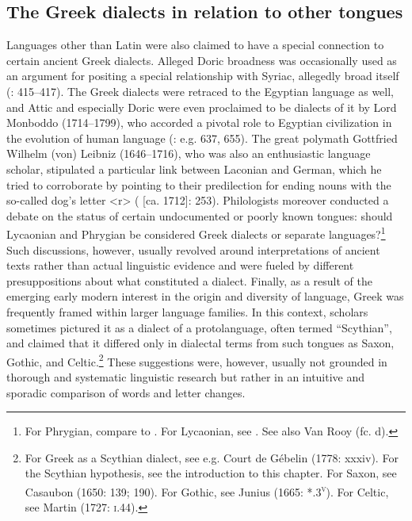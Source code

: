 \subsection{The Greek dialects in relation to other tongues}
\hypertarget{Toc19704841}{}
Languages other than Latin were also claimed to have a special connection to certain ancient Greek dialects. Alleged Doric broadness was occasionally used as an argument for positing a special relationship with Syriac, allegedly broad itself (\citealt{Saumaise1643a}: 415–417). The Greek dialects were retraced to the Egyptian language as well, and Attic and especially Doric were even proclaimed to be dialects of it by Lord Monboddo (1714–1799), who accorded a pivotal role to Egyptian civilization in the evolution of human language (\citealt{Monboddo1774}: e.g. 637, 655). The great polymath Gottfried Wilhelm (von) Leibniz (1646–1716), who was also an enthusiastic language scholar, stipulated a particular link between Laconian and German, which he tried to corroborate by pointing to their predilection for ending nouns with the so-called dog’s letter <r> (\citealt{Leibniz1991} [ca. 1712]: 253). Philologists moreover conducted a debate on the status of certain undocumented or poorly known tongues: should Lycaonian and Phrygian be considered Greek dialects or separate languages?\footnote{For Phrygian, compare \citet[465]{Rijcke1684} to \citet[16]{Jablonski1714}. For Lycaonian, see \citet[2]{Jablonski1714}. See also Van Rooy (fc. d).} Such discussions, however, usually revolved around interpretations of ancient texts rather than actual linguistic evidence and were fueled by different presuppositions about what constituted a dialect. Finally, as a result of the emerging early modern interest in the origin and diversity of language, Greek was frequently framed within larger language families. In this context, scholars sometimes pictured it as a dialect of a protolanguage, often termed “Scythian”, and claimed that it differed only in dialectal terms from such tongues as Saxon, Gothic, and Celtic.\footnote{For Greek as a Scythian dialect, see e.g. Court de Gébelin (1778: xxxiv). For the Scythian hypothesis, see the introduction to this chapter. For Saxon, see Casaubon (1650: 139; 190). For Gothic, see Junius (1665: *.3\textsc{\textsuperscript{v}}). For Celtic, see Martin (1727: \textsc{i}.44).} These suggestions were, however, usually not grounded in thorough and systematic linguistic research but rather in an intuitive and sporadic comparison of words and letter changes.

